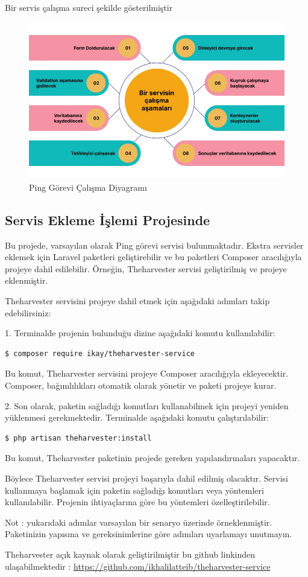 Bir servis çalışma sureci şekilde gösterilmiştir
\begin{figure}[H]
	\centering
	\includegraphics[width=0.6\linewidth]{images/service.jpeg}
	\caption{Ping Görevi Çalışma Diyagramı}
	\label{fig:ping_task_diagram}
\end{figure}

\subsection{Servis Ekleme İşlemi Projesinde}

Bu projede, varsayılan olarak Ping görevi servisi bulunmaktadır. Ekstra servisler eklemek için Laravel paketleri geliştirebilir ve bu paketleri Composer aracılığıyla projeye dahil edilebilir. Örneğin, Theharvester servisi geliştirilmiş ve projeye eklenmiştir.

Theharvester servisini projeye dahil etmek için aşağıdaki adımları takip edebilirsiniz:

1. Terminalde projenin bulunduğu dizine aşağıdaki komutu kullanılabilir:
\begin{lstlisting}[language=bash]
	$ composer require ikay/theharvester-service
\end{lstlisting}

Bu komut, Theharvester servisini projeye Composer aracılığıyla ekleyecektir. Composer, bağımlılıkları otomatik olarak yönetir ve paketi projeye kurar.

2. Son olarak, paketin sağladığı komutları kullanabilmek için projeyi yeniden yüklenmesi gerekmektedir. Terminalde aşağıdaki komutu çalıştırılabilir:
\begin{lstlisting}[language=bash]
	$ php artisan theharvester:install
\end{lstlisting}

Bu komut, Theharvester paketinin projede gereken yapılandırmaları yapacaktır.

Böylece Theharvester servisi projeyi başarıyla dahil edilmiş olacaktır. Servisi kullanmaya başlamak için paketin sağladığı komutları veya yöntemleri kullanılabilir. Projenin ihtiyaçlarına göre bu yöntemleri özelleştirilebilir.

Not : yukarıdaki adımlar varsayılan bir senaryo üzerinde örneklenmiştir. Paketinizin yapısına ve gereksinimlerine göre adımları uyarlamayı unutmayın.

Theharvester açık kaynak olarak geliştirilmiştir bu github linkinden ulaşabilmektedir : \href{https://github.com/ikhalilatteib/theharvester-service}{https://github.com/ikhalilatteib/theharvester-service}

